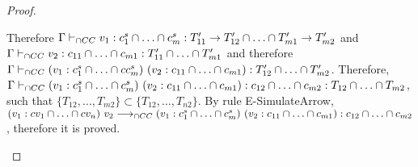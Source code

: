 \documentclass[a4paper]{article}
\begin{document}
\begin{proof}
\begin{itemize}
    Therefore $\Gamma \vdash_{\cap CC} v_1 : c^s_1 \cap \ldots \cap c^s_m : T_{11}' \rightarrow T_{12}' \cap \ldots \cap T_{m1}' \rightarrow T_{m2}'$ and $\Gamma \vdash_{\cap CC} v_2 : c_{11} \cap \ldots \cap c_{m1} : T_{11}' \cap \ldots \cap T_{m1}'$ and therefore $\Gamma \vdash_{\cap CC} (v_1 : c^s_1 \cap \ldots \cap c c^s_m)\ (v_2 : c_{11} \cap \ldots \cap c_{m1}) : T_{12}' \cap \ldots \cap T_{m2}'$.
    Therefore, $\Gamma \iccts (v_1 : c^s_1 \cap \ldots \cap c^s_m)\ (v_2 : c_{11} \cap \ldots \cap c_{m1}) : c_{12} \cap \ldots \cap c_{m2} : T_{12} \cap \ldots \cap T_{m2}$, such that $\{T_{12}, \ldots, T_{m2}\} \subset \{T_{12}, \ldots, T_{n2}\}$.
    By rule E-SimulateArrow, $(v_1 : cv_1 \cap \ldots \cap cv_n)\ v_2 \gios\\ (v_1 : c^s_1 \cap \ldots \cap c^s_m)\ (v_2 : c_{11} \cap \ldots \cap c_{m1}) : c_{12} \cap \ldots \cap c_{m2}$, therefore it is proved.

\end{itemize}
\end{proof}
\end{document}
